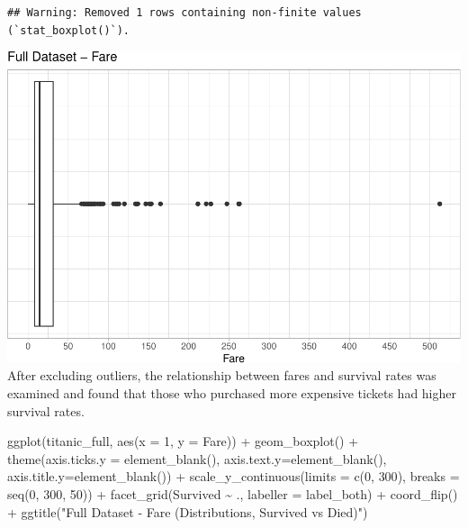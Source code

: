 \documentclass[
]{article}
\newenvironment{Shaded}{\begin{snugshade}}{\end{snugshade}}
\newcommand{\AttributeTok}[1]{\textcolor[rgb]{0.77,0.63,0.00}{#1}}
\newcommand{\DecValTok}[1]{\textcolor[rgb]{0.00,0.00,0.81}{#1}}
\newcommand{\FunctionTok}[1]{\textcolor[rgb]{0.00,0.00,0.00}{#1}}
\newcommand{\NormalTok}[1]{#1}
\newcommand{\SpecialCharTok}[1]{\textcolor[rgb]{0.00,0.00,0.00}{#1}}
\newcommand{\StringTok}[1]{\textcolor[rgb]{0.31,0.60,0.02}{#1}}
\begin{document}
\begin{verbatim}
## Warning: Removed 1 rows containing non-finite values (`stat_boxplot()`).
\end{verbatim}

\includegraphics{final_pdf_files/figure-latex/unnamed-chunk-20-1.pdf}
After excluding outliers, the relationship between fares and survival
rates was examined and found that those who purchased more expensive
tickets had higher survival rates.

\begin{Shaded}
\begin{Highlighting}[]
\FunctionTok{ggplot}\NormalTok{(titanic\_full, }\FunctionTok{aes}\NormalTok{(}\AttributeTok{x =} \DecValTok{1}\NormalTok{, }\AttributeTok{y =}\NormalTok{ Fare)) }\SpecialCharTok{+} 
  \FunctionTok{geom\_boxplot}\NormalTok{() }\SpecialCharTok{+} 
  \FunctionTok{theme}\NormalTok{(}\AttributeTok{axis.ticks.y =} \FunctionTok{element\_blank}\NormalTok{(), }
        \AttributeTok{axis.text.y=}\FunctionTok{element\_blank}\NormalTok{(), }
        \AttributeTok{axis.title.y=}\FunctionTok{element\_blank}\NormalTok{()) }\SpecialCharTok{+} 
  \FunctionTok{scale\_y\_continuous}\NormalTok{(}\AttributeTok{limits =} \FunctionTok{c}\NormalTok{(}\DecValTok{0}\NormalTok{, }\DecValTok{300}\NormalTok{), }\AttributeTok{breaks =} \FunctionTok{seq}\NormalTok{(}\DecValTok{0}\NormalTok{, }\DecValTok{300}\NormalTok{, }\DecValTok{50}\NormalTok{)) }\SpecialCharTok{+} 
  \FunctionTok{facet\_grid}\NormalTok{(Survived }\SpecialCharTok{\textasciitilde{}}\NormalTok{ ., }\AttributeTok{labeller =}\NormalTok{ label\_both) }\SpecialCharTok{+} 
  \FunctionTok{coord\_flip}\NormalTok{() }\SpecialCharTok{+} 
  \FunctionTok{ggtitle}\NormalTok{(}\StringTok{"Full Dataset {-} Fare (Distributions, Survived vs Died)"}\NormalTok{)}
\end{Highlighting}
\end{Shaded}
\end{document}
